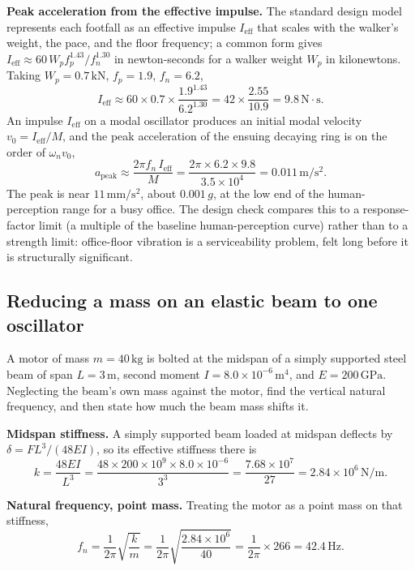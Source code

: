 \textbf{Peak acceleration from the effective impulse.} The standard
design model represents each footfall as an effective impulse $I_{\text{
eff}}$ that scales with the walker's weight, the pace, and the floor
frequency; a common form gives $I_{\text{eff}} \approx 60\,W_p f_p^{1.43}
/f_n^{1.30}$ in newton-seconds for a walker weight $W_p$ in kilonewtons.
Taking $W_p = 0.7\,\text{kN}$, $f_p = 1.9$, $f_n = 6.2$,
\[
I_{\text{eff}} \approx 60\times 0.7\times\frac{1.9^{1.43}}{6.2^{1.30}} =
42\times\frac{2.55}{10.9} = 9.8\,\text{N}\cdot\text{s}.
\]
An impulse $I_{\text{eff}}$ on a modal oscillator produces an initial
modal velocity $v_0 = I_{\text{eff}}/M$, and the peak acceleration of the
ensuing decaying ring is on the order of $\omega_n v_0$,
\[
a_{\text{peak}}\approx \frac{2\pi f_n\,I_{\text{eff}}}{M} = \frac{2\pi
\times 6.2\times 9.8}{3.5\times 10^4} = 0.011\,\si{\meter\per\second
\squared}.
\]
The peak is near $11\,\si{\milli\meter\per\second\squared}$, about
$0.001\,g$, at the low end of the human-perception range for a busy
office. The design check compares this to a response-factor limit (a
multiple of the baseline human-perception curve) rather than to a
strength limit: office-floor vibration is a serviceability problem, felt
long before it is structurally significant.

\subsection{Reducing a mass on an elastic beam to one oscillator}

A motor of mass $m = 40\,\si{\kilogram}$ is bolted at the midspan of a
simply supported steel beam of span $L = 3\,\si{\meter}$, second moment
$I = 8.0\times 10^{-6}\,\si{\meter\tothe{4}}$, and $E = 200\,\text{GPa}$.
Neglecting the beam's own mass against the motor, find the vertical
natural frequency, and then state how much the beam mass shifts it.

\textbf{Midspan stiffness.} A simply supported beam loaded at midspan
deflects by $\delta = FL^3/(48EI)$, so its effective stiffness there is
\[
k = \frac{48EI}{L^3} = \frac{48\times 200\times 10^9\times 8.0\times
10^{-6}}{3^3} = \frac{7.68\times 10^7}{27} = 2.84\times 10^6\,\si{
\newton\per\meter}.
\]

\textbf{Natural frequency, point mass.} Treating the motor as a point
mass on that stiffness,
\[
f_n = \frac{1}{2\pi}\sqrt{\frac{k}{m}} = \frac{1}{2\pi}\sqrt{\frac{2.84
\times 10^6}{40}} = \frac{1}{2\pi}\times 266 = 42.4\,\si{\hertz}.
\]

